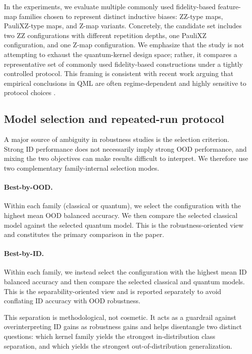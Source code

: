 \documentclass[journal]{IEEEtran}
\begin{document}
In the experiments, we evaluate multiple commonly used fidelity-based feature-map families chosen to represent distinct inductive biases: ZZ-type maps, PauliXZ-type maps, and Z-map variants. Concretely, the candidate set includes two ZZ configurations with different repetition depths, one PauliXZ configuration, and one Z-map configuration. We emphasize that the study is not attempting to exhaust the quantum-kernel design space; rather, it compares a representative set of commonly used fidelity-based constructions under a tightly controlled protocol. This framing is consistent with recent work arguing that empirical conclusions in QML are often regime-dependent and highly sensitive to protocol choices \cite{schuld2021encoding,bowles2024betterthanclassical,schnabel2025scrutiny}.

\subsection{Model selection and repeated-run protocol}

A major source of ambiguity in robustness studies is the selection criterion. Strong ID performance does not necessarily imply strong OOD performance, and mixing the two objectives can make results difficult to interpret. We therefore use two complementary family-internal selection modes.

\paragraph{Best-by-OOD.}
Within each family (classical or quantum), we select the configuration with the highest mean OOD balanced accuracy. We then compare the selected classical model against the selected quantum model. This is the robustness-oriented view and constitutes the primary comparison in the paper.

\paragraph{Best-by-ID.}
Within each family, we instead select the configuration with the highest mean ID balanced accuracy and then compare the selected classical and quantum models. This is the separability-oriented view and is reported separately to avoid conflating ID accuracy with OOD robustness.

This separation is methodological, not cosmetic. It acts as a guardrail against overinterpreting ID gains as robustness gains and helps disentangle two distinct questions: which kernel family yields the strongest in-distribution class separation, and which yields the strongest out-of-distribution generalization.
\end{document}
